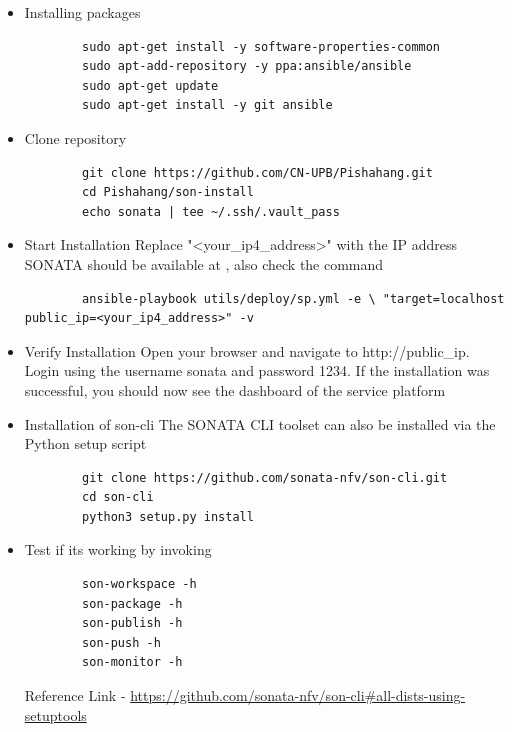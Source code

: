 	\begin{itemize}
		\item Installing packages
		\begin{lstlisting}
		sudo apt-get install -y software-properties-common
		sudo apt-add-repository -y ppa:ansible/ansible
		sudo apt-get update
		sudo apt-get install -y git ansible
		\end{lstlisting}
		\item Clone repository
		\begin{lstlisting}
		git clone https://github.com/CN-UPB/Pishahang.git
		cd Pishahang/son-install
		echo sonata | tee ~/.ssh/.vault_pass
		\end{lstlisting}
		\item Start Installation 
		Replace "<your\_ip4\_address>" with the IP address SONATA should be available at , also check the command
		\begin{lstlisting}
		ansible-playbook utils/deploy/sp.yml -e \ "target=localhost public_ip=<your_ip4_address>" -v 
		\end{lstlisting} 
		\item Verify Installation
		Open your browser and navigate to http://public\_ip. Login using the username sonata and password 1234. If the installation was successful, you should now see the dashboard of the service platform
		\item Installation of son-cli
		The SONATA CLI toolset can also be installed via the Python setup script
		\begin{lstlisting}
		git clone https://github.com/sonata-nfv/son-cli.git
		cd son-cli
		python3 setup.py install
		\end{lstlisting}
		
		\item Test if its working by invoking
		\begin{lstlisting}
		son-workspace -h
		son-package -h
		son-publish -h
		son-push -h
		son-monitor -h
		\end{lstlisting}
		Reference Link - \hyperlink{name}{https://github.com/sonata-nfv/son-cli\#all-dists-using-setuptools}
	\end{itemize}
	
	
	
